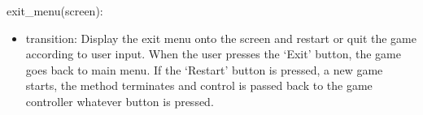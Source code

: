 \documentclass[12pt]{article}
\begin{document}
\noindent exit\_menu(screen):
\begin{itemize}
    \item transition: Display the exit menu onto the screen and restart or quit the game according to user input. When the user presses the `Exit' button, the game goes back to main menu. If the `Restart' button is pressed, a new game starts, the method terminates and control is passed back to the game controller whatever button is pressed.
\end{itemize}
\end{document}
